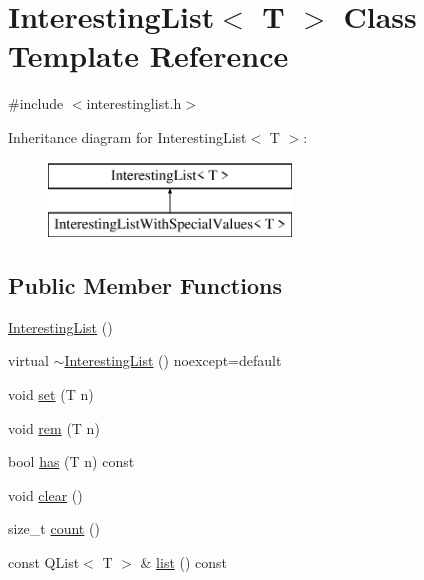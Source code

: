 \hypertarget{class_interesting_list}{}\section{Interesting\+List$<$ T $>$ Class Template Reference}
\label{class_interesting_list}


{\ttfamily \#include $<$interestinglist.\+h$>$}

Inheritance diagram for Interesting\+List$<$ T $>$\+:\begin{figure}[H]
\begin{center}
\leavevmode
\includegraphics[height=2.000000cm]{d7/dd7/class_interesting_list}
\end{center}
\end{figure}
\subsection*{Public Member Functions}
\begin{DoxyCompactItemize}
\item 
\mbox{\hyperlink{class_interesting_list_ac9ea4802571bb9c390fa9e50a877cbc4}{Interesting\+List}} ()
\item 
virtual \mbox{\hyperlink{class_interesting_list_a4a7e5ddecc5b391c26a643be7a0c432d}{$\sim$\+Interesting\+List}} () noexcept=default
\item 
void \mbox{\hyperlink{class_interesting_list_aeeb3053d51e9ae43362e71f47f6ea588}{set}} (T n)
\item 
void \mbox{\hyperlink{class_interesting_list_a3e6534f54ce15a0c2230b3d709eecee9}{rem}} (T n)
\item 
bool \mbox{\hyperlink{class_interesting_list_aae59505a735e134d456d8f5f5e878aec}{has}} (T n) const
\item 
void \mbox{\hyperlink{class_interesting_list_a72311bb3652528a1ed1aa0063369985d}{clear}} ()
\item 
size\+\_\+t \mbox{\hyperlink{class_interesting_list_a85fe3db13b57fa70901c47ca6d581d0d}{count}} ()
\item 
const Q\+List$<$ T $>$ \& \mbox{\hyperlink{class_interesting_list_a0f1175eed5455d92c96a0555ccb7aed0}{list}} () const
\end{DoxyCompactItemize}


